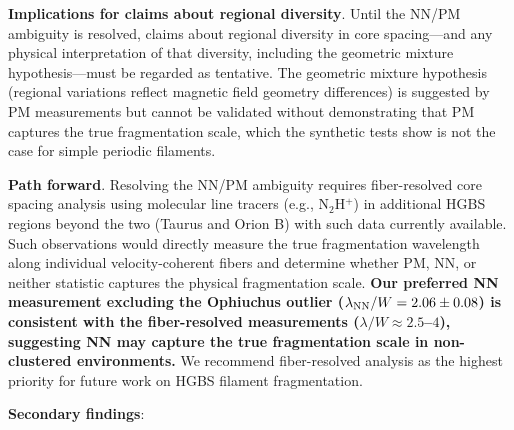 \documentclass[twoside,twocolumn]{mnras}
\begin{document}
\textbf{Implications for claims about regional diversity}. Until the NN/PM ambiguity is resolved, claims about regional diversity in core spacing---and any physical interpretation of that diversity, including the geometric mixture hypothesis---must be regarded as tentative. The geometric mixture hypothesis (regional variations reflect magnetic field geometry differences) is suggested by PM measurements but cannot be validated without demonstrating that PM captures the true fragmentation scale, which the synthetic tests show is not the case for simple periodic filaments.

\textbf{Path forward}. Resolving the NN/PM ambiguity requires fiber-resolved core spacing analysis using molecular line tracers (e.g., N$_2$H$^+$) in additional HGBS regions beyond the two (Taurus and Orion B) with such data currently available. Such observations would directly measure the true fragmentation wavelength along individual velocity-coherent fibers and determine whether PM, NN, or neither statistic captures the physical fragmentation scale. \textbf{Our preferred NN measurement excluding the Ophiuchus outlier ($\lambda_{\rm NN}/W = 2.06 \pm 0.08$) is consistent with the fiber-resolved measurements ($\lambda/W \approx 2.5$--$4$), suggesting NN may capture the true fragmentation scale in non-clustered environments.} We recommend fiber-resolved analysis as the highest priority for future work on HGBS filament fragmentation.

\textbf{Secondary findings}:
\end{document}
